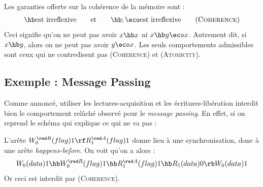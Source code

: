 \medskip

Les garanties offerte sur la cohérence de la mémoire sont :
\[
  \hb \text{est irreflexive} \qquad \text{et} \qquad \hb ; \eco  \text{est irreflexive} \tag{\textsc{Coherence}}
\]
Ceci signifie qu'on ne peut pas avoir $x \hb x$ ni $x \hb y \eco x$. Autrement
dit, si $x \hb y$, alors on ne peut pas avoir $y \eco x$. Les seuls
comportements admissibles sont ceux qui ne contredisent pas (\textsc{Coherence})
et (\textsc{Atomicity}).

\subsection{Exemple : Message Passing}

Comme annoncé, utiliser les lectures-acquisition et
les écritures-libération interdit bien le comportement relâché observé pour le
\emph{message passing}. En effet, si on reprend le schéma qui explique ce qui ne
va pas :

\begin{center}
\end{center}
L'arête $W^{\red R}_0(flag)1 \rf R^{\red A}_1(flag)1$ donne lieu à une
synchronisation, donc à une arête \emph{happens-before}. On voit qu'on a alors :
\[
  W_0(data)1 \hb W^{\red R}_0(flag)1 \hb R^{\red A}_1(flag)1 \hb R_1(data)0 \rb W_0(data)1
\]
Or ceci est interdit par (\textsc{Coherence}).

